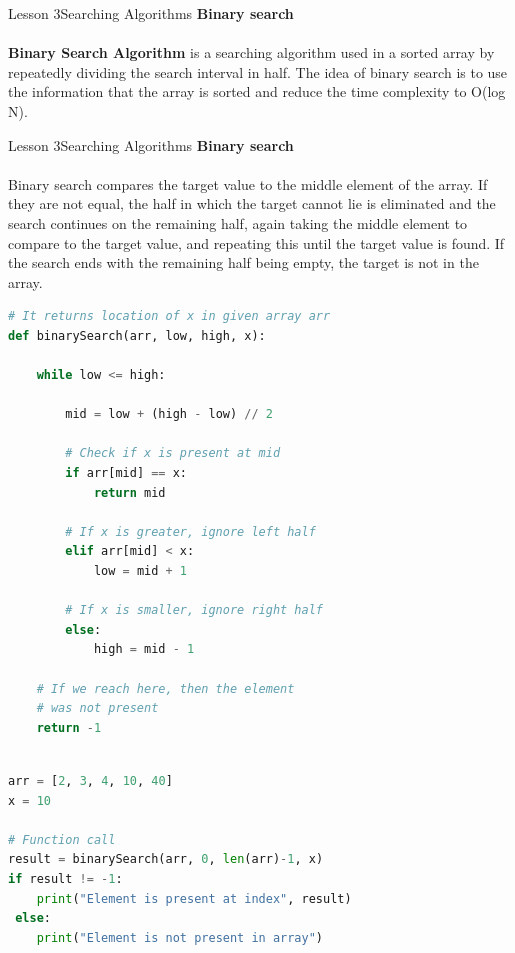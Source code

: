 \documentclass[aspectratio=1610]{beamer}
\begin{document}
\begin{frame}{Lesson 3}{Searching Algorithms}
\LARGE
\textbf{Binary search}\\~\\
\textbf{Binary Search Algorithm} is a searching algorithm used in a sorted array by
repeatedly dividing the search interval in half. The idea of binary search is to use the
information that the array is sorted and reduce the time complexity to O(log N). 
\end{frame}


\begin{frame}{Lesson 3}{Searching Algorithms}
\LARGE
\textbf{Binary search}\\~\\
Binary search compares the target value to the middle element of the array. If they are 
not equal, the half in which the target cannot lie is eliminated and the search continues 
on the remaining half, again taking the middle element to compare to the target value, and 
repeating this until the target value is found. If the search ends with the remaining half 
being empty, the target is not in the array.
\end{frame}

\begin{frame}[fragile]
\begin{lstlisting}[language=Python]
# It returns location of x in given array arr
def binarySearch(arr, low, high, x):

    while low <= high:

        mid = low + (high - low) // 2

        # Check if x is present at mid
        if arr[mid] == x:
            return mid

        # If x is greater, ignore left half
        elif arr[mid] < x:
            low = mid + 1

        # If x is smaller, ignore right half
        else:
            high = mid - 1

    # If we reach here, then the element
    # was not present
    return -1
\end{lstlisting}
\end{frame}


\begin{frame}[fragile]
\begin{lstlisting}[language=Python]

arr = [2, 3, 4, 10, 40]
x = 10

# Function call
result = binarySearch(arr, 0, len(arr)-1, x)
if result != -1:
    print("Element is present at index", result)
 else:
    print("Element is not present in array")
\end{lstlisting}
\end{frame}
\end{document}
